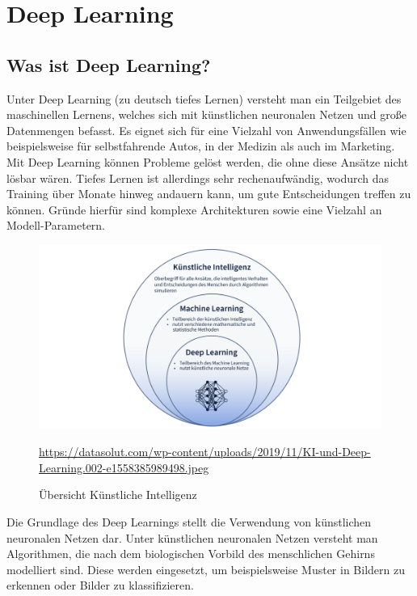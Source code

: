 \chapter{Deep Learning}

\section{Was ist Deep Learning?}

Unter Deep Learning (zu deutsch tiefes Lernen) versteht man ein Teilgebiet des maschinellen Lernens, welches sich mit künstlichen neuronalen Netzen und große Datenmengen befasst. Es eignet sich für eine Vielzahl von Anwendungsfällen wie beispielsweise für selbstfahrende Autos, in der Medizin als auch im Marketing. \cite{datasolut2}\\

Mit Deep Learning können Probleme gelöst werden, die ohne diese Ansätze nicht lösbar wären. Tiefes Lernen ist allerdings sehr rechenaufwändig, wodurch das Training über Monate hinweg andauern kann, um gute Entscheidungen treffen zu können. Gründe hierfür sind komplexe Architekturen sowie eine Vielzahl an Modell-Parametern. \cite{datasolut2} \\

\begin{figure}[H]
	\centering
	\includegraphics[width=\textwidth]{kapitel3/images/KI_Uebersicht.png}
	\caption{Übersicht Künstliche Intelligenz}
	\vspace{0.2cm}
	\quelle\url{https://datasolut.com/wp-content/uploads/2019/11/KI-und-Deep-Learning.002-e1558385989498.jpeg}
\end{figure}

Die Grundlage des Deep Learnings stellt die Verwendung von künstlichen neuronalen Netzen dar. Unter künstlichen neuronalen Netzen versteht man Algorithmen, die nach dem biologischen Vorbild des menschlichen Gehirns modelliert sind. Diese werden eingesetzt, um beispielsweise Muster in Bildern zu erkennen oder Bilder zu klassifizieren. \cite{datasolut2}\\

